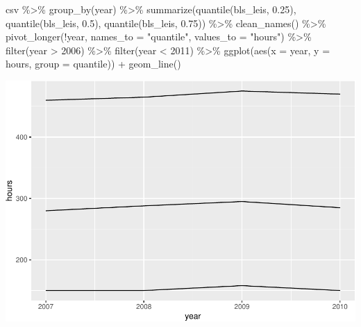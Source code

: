\documentclass[
]{article}
\newenvironment{Shaded}{\begin{snugshade}}{\end{snugshade}}
\newcommand{\AttributeTok}[1]{\textcolor[rgb]{0.77,0.63,0.00}{#1}}
\newcommand{\DecValTok}[1]{\textcolor[rgb]{0.00,0.00,0.81}{#1}}
\newcommand{\FloatTok}[1]{\textcolor[rgb]{0.00,0.00,0.81}{#1}}
\newcommand{\FunctionTok}[1]{\textcolor[rgb]{0.00,0.00,0.00}{#1}}
\newcommand{\NormalTok}[1]{#1}
\newcommand{\SpecialCharTok}[1]{\textcolor[rgb]{0.00,0.00,0.00}{#1}}
\newcommand{\StringTok}[1]{\textcolor[rgb]{0.31,0.60,0.02}{#1}}
\begin{document}
\begin{Shaded}
\begin{Highlighting}[]
\NormalTok{csv }\SpecialCharTok{\%\textgreater{}\%}
  \FunctionTok{group\_by}\NormalTok{(year) }\SpecialCharTok{\%\textgreater{}\%}
  \FunctionTok{summarize}\NormalTok{(}\FunctionTok{quantile}\NormalTok{(bls\_leis, }\FloatTok{0.25}\NormalTok{), }\FunctionTok{quantile}\NormalTok{(bls\_leis, }\FloatTok{0.5}\NormalTok{), }\FunctionTok{quantile}\NormalTok{(bls\_leis, }\FloatTok{0.75}\NormalTok{)) }\SpecialCharTok{\%\textgreater{}\%}
  \FunctionTok{clean\_names}\NormalTok{() }\SpecialCharTok{\%\textgreater{}\%}
  \FunctionTok{pivot\_longer}\NormalTok{(}\SpecialCharTok{!}\NormalTok{year, }\AttributeTok{names\_to =} \StringTok{"quantile"}\NormalTok{, }\AttributeTok{values\_to =} \StringTok{"hours"}\NormalTok{) }\SpecialCharTok{\%\textgreater{}\%}
  \FunctionTok{filter}\NormalTok{(year }\SpecialCharTok{\textgreater{}} \DecValTok{2006}\NormalTok{) }\SpecialCharTok{\%\textgreater{}\%}
  \FunctionTok{filter}\NormalTok{(year }\SpecialCharTok{\textless{}} \DecValTok{2011}\NormalTok{) }\SpecialCharTok{\%\textgreater{}\%}
  \FunctionTok{ggplot}\NormalTok{(}\FunctionTok{aes}\NormalTok{(}\AttributeTok{x =}\NormalTok{ year, }\AttributeTok{y =}\NormalTok{ hours, }\AttributeTok{group =}\NormalTok{ quantile)) }\SpecialCharTok{+}
  \FunctionTok{geom\_line}\NormalTok{()}
\end{Highlighting}
\end{Shaded}

\includegraphics{Paper2_files/figure-latex/graphs-8.pdf}
\end{document}
